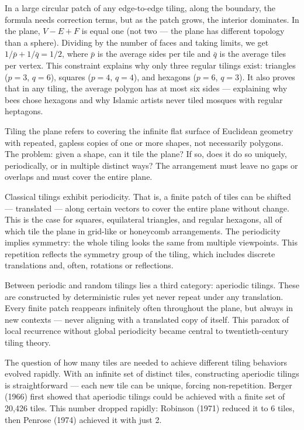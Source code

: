 In a large circular patch of any edge-to-edge tiling, along the boundary, the formula needs correction terms, but as the patch grows, the interior dominates. In the plane, $V - E + F$ is equal one (not two — the plane has different topology than a sphere). Dividing by the number of faces and taking limits, we get $1/\bar{p} + 1/\bar{q} = 1/2$, where $\bar{p}$ is the average sides per tile and $\bar{q}$ is the average tiles per vertex. This constraint explains why only three regular tilings exist: triangles ($p=3$, $q=6$), squares ($p=4$, $q=4$), and hexagons ($p=6$, $q=3$). It also proves that in any tiling, the average polygon has at most six sides — explaining why bees chose hexagons and why Islamic artists never tiled mosques with regular heptagons.

Tiling the plane refers to covering the infinite flat surface of Euclidean geometry with repeated, gapless copies of one or more shapes, not necessarily polygons. The problem: given a shape, can it tile the plane? If so, does it do so uniquely, periodically, or in multiple distinct ways? The arrangement must leave no gaps or overlaps and must cover the entire plane.

Classical tilings exhibit periodicity. That is, a finite patch of tiles can be shifted — translated — along certain vectors to cover the entire plane without change. This is the case for squares, equilateral triangles, and regular hexagons, all of which tile the plane in grid-like or honeycomb arrangements. The periodicity implies symmetry: the whole tiling looks the same from multiple viewpoints. This repetition reflects the symmetry group of the tiling, which includes discrete translations and, often, rotations or reflections.

Between periodic and random tilings lies a third category: aperiodic tilings. These are constructed by deterministic rules yet never repeat under any translation. Every finite patch reappears infinitely often throughout the plane, but always in new contexts — never aligning with a translated copy of itself. This paradox of local recurrence without global periodicity became central to twentieth-century tiling theory.

The question of how many tiles are needed to achieve different tiling behaviors evolved rapidly. With an infinite set of distinct tiles, constructing aperiodic tilings is straightforward — each new tile can be unique, forcing non-repetition. Berger (1966) first showed that aperiodic tilings could be achieved with a finite set of 20,426 tiles. This number dropped rapidly: Robinson (1971) reduced it to 6 tiles, then Penrose (1974) achieved it with just 2.

